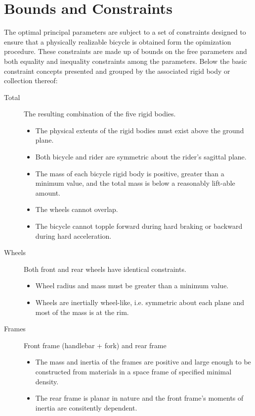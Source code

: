 \documentclass{bmd2019a}
\begin{document}
\section{Bounds and Constraints}
%
The optimal principal parameters are subject to a set of constraints designed
to ensure that a physically realizable bicycle is obtained form the opimization
procedure. These constraints are made up of bounds on the free parameters and
both equality and inequality constraints among the parameters. Below the basic
constraint concepts presented and grouped by the associated rigid body or
collection thereof:
%
\begin{description}
  \item[Total] The resulting combination of the five rigid bodies.
    \begin{itemize}
      \item The physical extents of the rigid bodies must exist above the
        ground plane.
      \item Both bicycle and rider are symmetric about the rider's sagittal
        plane.
      \item The mass of each bicycle rigid body is positive, greater than a
        minimum value, and the total mass is below a reasonably lift-able
        amount.
      \item The wheels cannot overlap.
      \item The bicycle cannot topple forward during hard braking or backward
        during hard acceleration.
    \end{itemize}

  \item[Wheels] Both front and rear wheels have identical constraints.
    \begin{itemize}
      \item Wheel radius and mass must be greater than a minimum value.
      \item Wheels are inertially wheel-like, i.e. symmetric about each plane
        and most of the mass is at the rim.
    \end{itemize}

  \item[Frames] Front frame (handlebar + fork) and rear frame
    \begin{itemize}
      \item The mass and inertia of the frames are positive and large enough to
        be constructed from materials in a space frame of specified minimal
        density.
      \item The rear frame is planar in nature and the front frame's moments of
        inertia are consitently dependent.
    \end{itemize}


\end{description}
\end{document}
